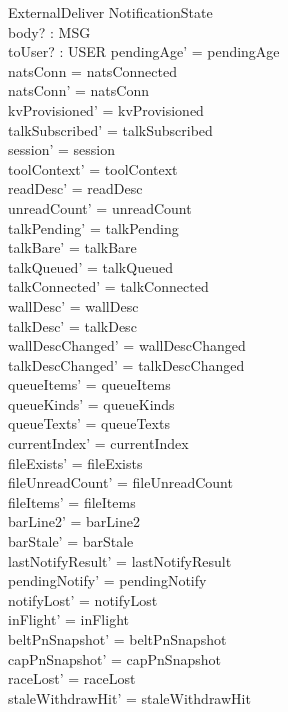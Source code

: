 \documentclass[a4paper,10pt,fleqn]{article}
\begin{document}
\begin{schema}{ExternalDeliver}
  \Delta NotificationState \\
  body? : MSG \\
  toUser? : USER
  \where
  pendingAge' = pendingAge \\
  natsConn = natsConnected \\
  natsConn' = natsConn \\
  kvProvisioned' = kvProvisioned \\
  talkSubscribed' = talkSubscribed \\
  session' = session \\
  toolContext' = toolContext \\
  readDesc' = readDesc \\
  unreadCount' = unreadCount \\
  talkPending' = talkPending \\
  talkBare' = talkBare \\
  talkQueued' = talkQueued \\
  talkConnected' = talkConnected \\
  wallDesc' = wallDesc \\
  talkDesc' = talkDesc \\
  wallDescChanged' = wallDescChanged \\
  talkDescChanged' = talkDescChanged \\
  queueItems' = queueItems \\
  queueKinds' = queueKinds \\
  queueTexts' = queueTexts \\
  currentIndex' = currentIndex \\
  fileExists' = fileExists \\
  fileUnreadCount' = fileUnreadCount \\
  fileItems' = fileItems \\
  barLine2' = barLine2 \\
  barStale' = barStale \\
  lastNotifyResult' = lastNotifyResult \\
  pendingNotify' = pendingNotify \\
  notifyLost' = notifyLost \\
  inFlight' = inFlight \\
  beltPnSnapshot' = beltPnSnapshot \\
  capPnSnapshot' = capPnSnapshot \\
  raceLost' = raceLost \\
  staleWithdrawHit' = staleWithdrawHit \\

\end{schema}
\end{document}
